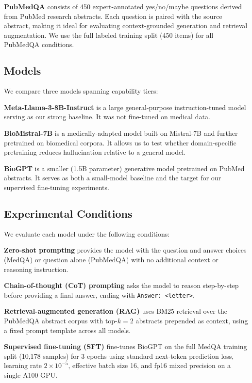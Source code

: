\documentclass[11pt]{article}
\begin{document}
\textbf{PubMedQA} \cite{jin2019pubmedqa} consists of 450 
expert-annotated yes/no/maybe questions derived from PubMed research 
abstracts. Each question is paired with the source abstract, making it 
ideal for evaluating context-grounded generation and retrieval 
augmentation. We use the full labeled training split (450 items) for 
all PubMedQA conditions.

\subsection{Models}
We compare three models spanning capability tiers:

\textbf{Meta-Llama-3-8B-Instruct} is a large general-purpose 
instruction-tuned model serving as our strong baseline. It was not 
fine-tuned on medical data.

\textbf{BioMistral-7B} \cite{labrak2024biomistral} is a 
medically-adapted model built on Mistral-7B and further pretrained on 
biomedical corpora. It allows us to test whether domain-specific 
pretraining reduces hallucination relative to a general model.

\textbf{BioGPT} \cite{luo2022biogpt} is a smaller (1.5B parameter) 
generative model pretrained on PubMed abstracts. It serves as both a 
small-model baseline and the target for our supervised fine-tuning 
experiments.

\subsection{Experimental Conditions}
We evaluate each model under the following conditions:

\textbf{Zero-shot prompting} provides the model with the question and 
answer choices (MedQA) or question alone (PubMedQA) with no additional 
context or reasoning instruction.

\textbf{Chain-of-thought (CoT) prompting} asks the model to reason 
step-by-step before providing a final answer, ending with 
\texttt{Answer: <letter>}.

\textbf{Retrieval-augmented generation (RAG)} uses BM25 retrieval over 
the PubMedQA abstract corpus with top-$k{=}2$ abstracts prepended as 
context, using a fixed prompt template across all models.

\textbf{Supervised fine-tuning (SFT)} fine-tunes BioGPT on the full 
MedQA training split (10,178 samples) for 3 epochs using standard 
next-token prediction loss, learning rate $2 \times 10^{-5}$, effective 
batch size 16, and fp16 mixed precision on a single A100 GPU.
\end{document}
